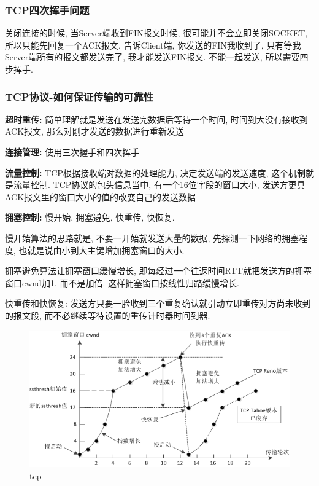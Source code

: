 \documentclass[UTF8]{ctexart}
\begin{document}
\subsubsection{TCP四次挥手问题}
关闭连接的时候, 当Server端收到FIN报文时候, 很可能并不会立即关闭SOCKET, 所以只能先回复一个ACK报文, 告诉Client端, 你发送的FIN我收到了, 只有等我Server端所有的报文都发送完了, 我才能发送FIN报文. 不能一起发送, 所以需要四步挥手.
\subsubsection{TCP协议-如何保证传输的可靠性}
\textbf{超时重传:} 简单理解就是发送在发送完数据后等待一个时间, 时间到大没有接收到ACK报文, 那么对刚才发送的数据进行重新发送
\par
\textbf{连接管理:} 使用三次握手和四次挥手
\par
\textbf{流量控制:} TCP根据接收端对数据的处理能力, 决定发送端的发送速度, 这个机制就是流量控制. TCP协议的包头信息当中, 有一个16位字段的窗口大小, 发送方更具ACK报文里的窗口大小的值的改变自己的发送数据
\par
\textbf{拥塞控制:} 慢开始, 拥塞避免, 快重传, 快恢复.
\par
慢开始算法的思路就是, 不要一开始就发送大量的数据, 先探测一下网络的拥塞程度, 也就是说由小到大主键增加拥塞窗口的大小.
\par
拥塞避免算法让拥塞窗口缓慢增长, 即每经过一个往返时间RTT就把发送方的拥塞窗口cwnd加1, 而不是加倍. 这样拥塞窗口按线性归路缓慢增长.
\par
快重传和快恢复: 发送方只要一脸收到三个重复确认就引动立即重传对方尚未收到的报文段, 而不必继续等待设置的重传计时器时间到器.
\begin{figure}
	\centering
	\includegraphics[width=0.7\linewidth]{figures/tcp.png}
	\caption{tcp}
	\label{fig:tcp}
\end{figure}
\end{document}
